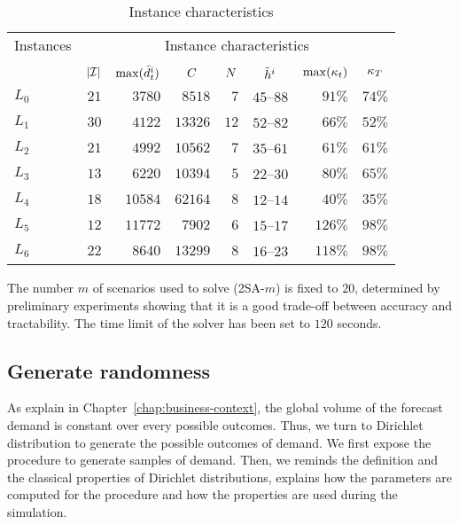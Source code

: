 \begin{table}[ht]
\begin{center}
\begin{tabular*}{\linewidth}{@{\extracolsep{\fill}}lrrrrrrr@{\extracolsep{\fill}}}
\hline
Instances &
\multicolumn{7}{c}{Instance characteristics}
\\\cline{2-8}
\\
& $\card{\REF}$
& $\max(\bar{d}_t^i)$
& \multicolumn{1}{c}{$C$}
& \multicolumn{1}{c}{$N$}
& \multicolumn{1}{c}{$\tilde{h}^i$}
& \multicolumn{1}{c}{$\max\bracket{\kappa_t}$}
& \multicolumn{1}{c}{$\kappa_{T}$}
\\\hline
$L_0$ & $21$ & $3780$ & $8518$ & $7$ & $45$--$88$ & $91\%$ & $74\%$
\\
$L_1$ & $30$ & $4122$ & $13326$ & $12$ & $52$--$82$ & $66\%$ & $52\%$
\\
$L_2$ & $21$ & $4992$ & $10562$ & $7$ & $35$--$61$ & $61\%$ & $61\%$
\\
$L_3$ & $13$ & $6220$ & $10394$ & $5$ & $22$--$30$ & $80\%$ & $65\%$
\\
$L_4$ & $18$ & $10584$ & $62164$ & $8$ & $12$--$14$ & $40\%$ & $35\%$
\\
$L_5$ & $12$ & $11772$ & $7902$ & $6$ & $15$--$17$ & $126\%$ & $98\%$
\\
$L_6$ & $22$ & $8640$ & $13299$ & $8$ & $16$--$23$ & $118\%$ & $98\%$
\\\hline
\end{tabular*}
\caption{Instance characteristics}
\label{tab:instances-characteristics}
\end{center}
\end{table}

The number $m$ of scenarios used to solve (2SA-$m$) is fixed to $20$, determined by preliminary experiments showing that it is a good trade-off between accuracy and tractability. The time limit of the solver has been set to $120$ seconds.




\subsection{Generate randomness}
\label{sec:PDP:numerical-experiments:dirichlet}


As explain in Chapter~\ref{chap:business-context}, the global volume of the forecast demand is constant over every possible outcomes. Thus, we turn to Dirichlet distribution to generate the possible outcomes of demand. We first expose the procedure to generate samples of demand. Then, we reminds the definition and the classical properties of Dirichlet distributions, explains how the parameters are computed for the procedure and how the properties are used during the simulation.

